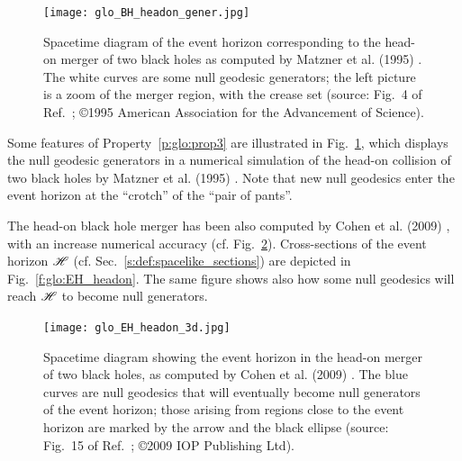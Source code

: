 \begin{figure}
\centerline{\texttt{[image: glo\_BH\_headon\_gener.jpg]}}
\caption[]{\label{f:glo:BH_headon_gener} \footnotesize
Spacetime diagram of the event horizon corresponding to the head-on merger of
two black holes as computed by Matzner et al. (1995) \cite{Matzn_al95}. The
white curves are some null geodesic generators; the left picture is a zoom of
the merger region, with the crease set
(source: Fig.~4 of Ref.~\cite{Matzn_al95}; \copyright 1995 American Association for the Advancement of Science).}
\end{figure}



Some features of Property~\ref{p:glo:prop3} are illustrated in Fig.~\ref{f:glo:BH_headon_gener},
which displays the null geodesic generators in a numerical simulation
of the head-on collision of two black holes by Matzner et al. (1995) \cite{Matzn_al95}.
Note that new null geodesics enter the event horizon at the ``crotch'' of the
``pair of pants''.

The head-on black hole merger has been also computed by Cohen et al. (2009) \cite{CohenPS09}, with an increase numerical accuracy (cf. Fig.~\ref{f:glo:EH_headon_3d}).
Cross-sections of the event horizon $\mathscr{H}$ (cf. Sec.~\ref{s:def:spacelike_sections})
are depicted in Fig.~\ref{f:glo:EH_headon}. The same figure shows also how
some null geodesics will reach $\mathscr{H}$ to become null generators.


\begin{figure}
\centerline{\texttt{[image: glo\_EH\_headon\_3d.jpg]}}
\caption[]{\label{f:glo:EH_headon_3d} \footnotesize
Spacetime diagram showing the event horizon in the head-on merger of
two black holes, as computed by Cohen et al. (2009) \cite{CohenPS09}.
The blue curves are null geodesics that will eventually become null generators
of the event horizon; those arising from regions close to the event horizon
are marked by the arrow and the black ellipse
(source: Fig.~15 of Ref.~\cite{CohenPS09}; \copyright 2009 IOP Publishing Ltd).}
\end{figure}

